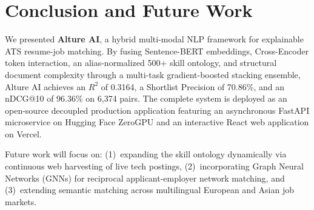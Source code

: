 \documentclass[conference]{IEEEtran}
\begin{document}
\section{Conclusion and Future Work}

We presented \textbf{Alture AI}, a hybrid multi-modal NLP framework for explainable ATS resume-job matching. By fusing Sentence-BERT embeddings, Cross-Encoder token interaction, an alias-normalized 500+ skill ontology, and structural document complexity through a multi-task gradient-boosted stacking ensemble, Alture AI achieves an $R^2$ of 0.3164, a Shortlist Precision of 70.86\%, and an nDCG@10 of 96.36\% on 6,374 pairs. The complete system is deployed as an open-source decoupled production application featuring an asynchronous FastAPI microservice on Hugging Face ZeroGPU and an interactive React web application on Vercel.

Future work will focus on: (1)~expanding the skill ontology dynamically via continuous web harvesting of live tech postings, (2)~incorporating Graph Neural Networks (GNNs) for reciprocal applicant-employer network matching, and (3)~extending semantic matching across multilingual European and Asian job markets.
\end{document}
